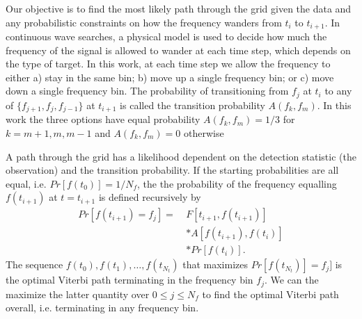 \documentclass[paper-main.tex]{subfiles}
\begin{document}
Our objective is to find the most likely path through the grid given the data and any probabilistic constraints on how the frequency wanders from $t_i$ to $t_{i+1}$. 
In continuous wave searches, a physical model is used to decide how much the frequency of the signal is allowed to wander at each time step, which depends on the type of target. 
In this work, at each time step we allow the frequency to either a) stay in the same bin; b) move up a single frequency bin; or c) move down a single frequency bin. 
The probability of transitioning from $f_j$ at $t_i$ to any of $\{f_{j+1},f_j,f_{j-1}\}$ at $t_{i+1}$ is called the transition probability $A(f_k,f_m)$. 
In this work the three options have equal probability $A(f_k,f_m)=1/3$ for $k=m+1,m,m-1$ and $A(f_k,f_m)=0$ otherwise 


A path through the grid has a likelihood dependent on the detection statistic (the observation) and the transition probability.
If the starting probabilities are all equal, i.e. $Pr[f(t_0)] = 1/N_f$, the the probability of the frequency equalling $f(t_{i+1})$ at $t = t_{i+1}$ is defined recursively by
\begin{eqnarray}
Pr[f(t_{i+1})=f_j] =~& F[t_{i+1},f(t_{i+1})] \nonumber \\
                     &*A[f(t_{i+1}),f(t_i)]  \nonumber \\
                     & *Pr[f(t_i)].
\label{eqn:recursiveViterbi}
\end{eqnarray}
The sequence $f(t_0),f(t_1),\dots,f(t_{N_t})$ that maximizes $Pr[f(t_{N_t})] = f_j]$ is the optimal Viterbi path terminating in the frequency bin $f_j$. 
We can the maximize the latter quantity over $0 \leq j \leq N_f$ to find the optimal Viterbi path overall, i.e. terminating in any frequency bin. 
\end{document}
